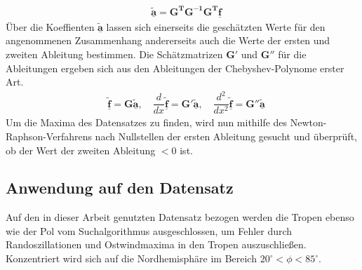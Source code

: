 \begin{align}
& \underline{\boldsymbol{\tilde{a}}} = \boldsymbol{G^TG^{-1}G^T}\underline{\boldsymbol{f}} 
\end{align}
Über die Koeffienten $\underline{\boldsymbol{\tilde{a}}}$ lassen sich einerseits die geschätzten Werte für den angenommenen Zusammenhang andererseits auch die Werte der ersten und zweiten Ableitung bestimmen. Die Schätzmatrizen $\boldsymbol{G}'$ und $\boldsymbol{G}''$ für die Ableitungen ergeben sich aus den Ableitungen der Chebyshev-Polynome erster Art.
\begin{align}
& \underline{\boldsymbol{\tilde{f}}} = \boldsymbol{G}\underline{\boldsymbol{\tilde{a}}}, \hspace{1em} \dfrac{d}{dx}\underline{\boldsymbol{\tilde{f}}} = \boldsymbol{G}'\underline{\boldsymbol{\tilde{a}}}, \hspace{1em} \dfrac{d^2}{dx^2}\underline{\boldsymbol{\tilde{f}}} = \boldsymbol{G}''\underline{\boldsymbol{\tilde{a}}}
\end{align}
Um die Maxima des Datensatzes zu finden, wird nun mithilfe des Newton-Raphson-Verfahrens nach Nullstellen der ersten Ableitung gesucht und überprüft, ob der Wert der zweiten Ableitung $<0$ ist. 
\subsection{Anwendung auf den Datensatz}
Auf den in dieser Arbeit genutzten Datensatz bezogen werden die Tropen ebenso wie der Pol vom Suchalgorithmus ausgeschlossen, um Fehler durch Randoszillationen und Ostwindmaxima in den Tropen auszuschließen. Konzentriert wird sich auf die Nordhemisphäre im Bereich $20^{\circ} < \phi < 85^{\circ}$.

